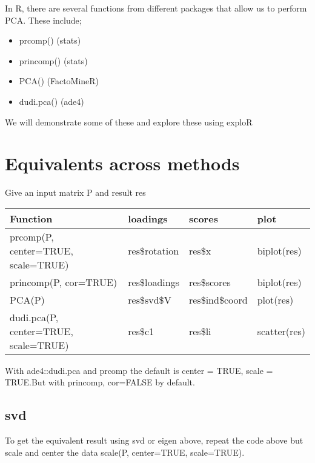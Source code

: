 \documentclass[]{article}
\newenvironment{Shaded}{\begin{snugshade}}{\end{snugshade}}
\newcommand{\KeywordTok}[1]{\textcolor[rgb]{0.13,0.29,0.53}{\textbf{#1}}}
\newcommand{\OperatorTok}[1]{\textcolor[rgb]{0.81,0.36,0.00}{\textbf{#1}}}
\newcommand{\NormalTok}[1]{#1}
\providecommand{\tightlist}{%
  \setlength{\itemsep}{0pt}\setlength{\parskip}{0pt}}
\begin{document}
In R, there are several functions from different packages that allow us
to perform PCA. These include;

\begin{itemize}
\tightlist
\item
  prcomp() (stats)
\item
  princomp() (stats)
\item
  PCA() (FactoMineR)
\item
  dudi.pca() (ade4)
\end{itemize}

We will demonstrate some of these and explore these using exploR

\hypertarget{equivalents-across-methods}{%
\section{Equivalents across methods}\label{equivalents-across-methods}}

Give an input matrix P and result res

\begin{longtable}[]{@{}llll@{}}
\toprule
Function & loadings & scores & plot\tabularnewline
\midrule
\endhead
prcomp(P, center=TRUE, scale=TRUE) & res\$rotation & res\$x &
biplot(res)\tabularnewline
princomp(P, cor=TRUE) & res\$loadings & res\$scores &
biplot(res)\tabularnewline
PCA(P) & res\$svd\$V & res\$ind\$coord & plot(res)\tabularnewline
dudi.pca(P, center=TRUE, scale=TRUE) & res\$c1 & res\$li &
scatter(res)\tabularnewline
\bottomrule
\end{longtable}

With ade4::dudi.pca and prcomp the default is center = TRUE, scale =
TRUE.But with princomp, cor=FALSE by default.

\hypertarget{svd}{%
\subsection{svd}\label{svd}}

To get the equivalent result using svd or eigen above, repeat the code
above but scale and center the data scale(P, center=TRUE, scale=TRUE).

\begin{Shaded}
\end{Shaded}
\end{document}
